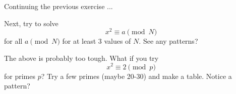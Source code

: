 Continuing the previous exercise ...
  \begin{myenum}
  \item
    Next, try to solve 
    \[
      x^2 \equiv a \pmod{N}
    \]
    for all $a \pmod{N}$ for at least 3 values of $N$.
    See any patterns? 
  \item
    The above is probably too tough.
    What if you try
    \[
      x^2 \equiv 2 \pmod{p}
    \]
    for primes $p$? Try a few primes (maybe 20-30) and make a table. Notice a pattern?
  \end{myenum}

